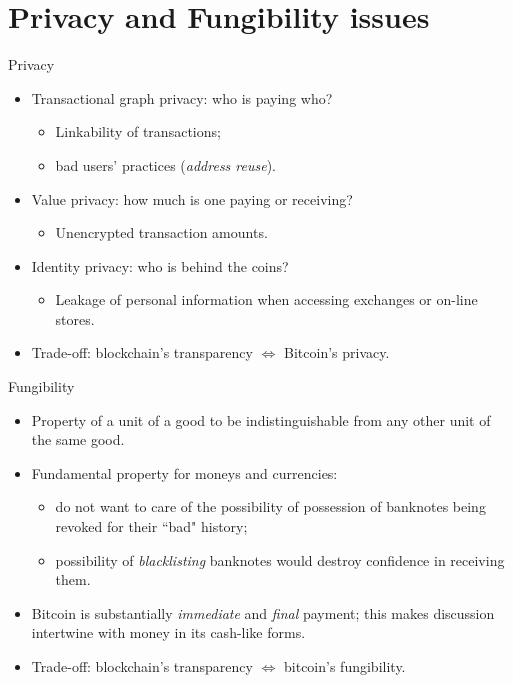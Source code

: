 \documentclass[usenames,dvipsnames]{beamer}
\begin{document}
    \section{Privacy and Fungibility issues}
        \begin{frame}{Privacy}
            \begin{itemize}
                \item Transactional graph privacy: who is paying who?
                \begin{itemize}
                    \item Linkability of transactions;
                    \item bad users' practices (\textit{address reuse}).
                \end{itemize}
                \item Value privacy: how much is one paying or receiving?
                \begin{itemize}
                    \item Unencrypted transaction amounts.
                \end{itemize}
                \item Identity privacy: who is behind the coins?
                \begin{itemize}
                    \item Leakage of personal information when accessing exchanges or on-line stores. 
                \end{itemize}
                \item Trade-off: blockchain's transparency $\Leftrightarrow$ Bitcoin's privacy.
            \end{itemize}
        \end{frame}
        
        \begin{frame}{Fungibility}
            \begin{itemize}
                \item Property of a unit of a good to be indistinguishable from any other unit of the same good.
                \item Fundamental property for moneys and currencies:
                \begin{itemize}
                    \item do not want to care of the possibility of possession of banknotes being revoked for their ``bad" history;
                    \item possibility of \textit{blacklisting} banknotes would destroy confidence in receiving them.
                \end{itemize}
                \item Bitcoin is substantially \textit{immediate} and \textit{final} payment; this makes discussion intertwine with money in its cash-like forms.
                \item Trade-off: blockchain's transparency $\Leftrightarrow$ bitcoin's fungibility.
            \end{itemize}
        \end{frame}
\end{document}
